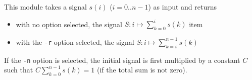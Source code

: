 This module takes a signal $s(i)$ ($i=0..n-1$) as input and returns
\begin{itemize}
\item with no option selected, the signal $S: i\mapsto \sum_{k=0}^i s(k)$ item \item with the \verb+-r+ option selected, 
the signal $S: i\mapsto \sum_{k=i}^{n-1} s(k)$ 
\end{itemize}
If the \verb+-n+ option is selected, the initial signal is first
multiplied by a constant $C$ such that $C \sum_{k=0}^{n-1} s(k)=1$
(if the total sum is not zero).